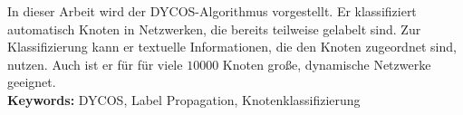 In dieser Arbeit wird der DYCOS-Algorithmus vorgestellt. Er 
klassifiziert automatisch Knoten in Netzwerken, die bereits
teilweise gelabelt sind. Zur Klassifizierung kann er textuelle
Informationen, die den Knoten zugeordnet sind, nutzen. Auch ist
er für für viele $\num{10000}$ Knoten große, dynamische Netzwerke
geeignet.\\

\textbf{Keywords:} DYCOS, Label Propagation, Knotenklassifizierung
